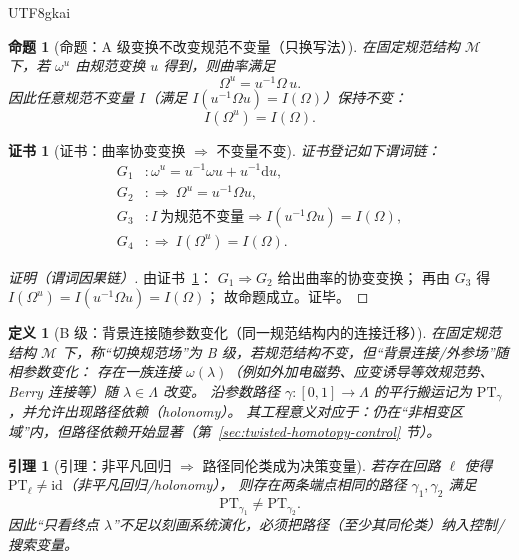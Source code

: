 \documentclass[12pt]{article}
\newtheorem{definition}{定义}[section]
\newtheorem{proposition}{命题}[section]
\newtheorem{lemma}{引理}[section]
\newtheorem{Certificate}{证书}[section]
\newcommand{\Conn}{\ensuremath{\omega}}
\newcommand{\Curv}{\ensuremath{\Omega}}
\begin{document}
\begin{CJK*}{UTF8}{gkai}
\begin{proposition}[命题：A 级变换不改变规范不变量（只换写法）]
\label{prop:gauge-fixing-does-not-change-invariants}
在固定规范结构 $\mathcal{M}$ 下，若 $\Conn^{u}$ 由规范变换 $u$ 得到，则曲率满足
\[
  \Curv^{u}=u^{-1}\Curv\,u.
\]
因此任意规范不变量 $I$（满足 $I(u^{-1}\Curv u)=I(\Curv)$）保持不变：
\[
  I(\Curv^{u})=I(\Curv).
\]
\end{proposition}

\begin{Certificate}[证书：曲率协变变换 $\Rightarrow$ 不变量不变]
\label{cert:gauge-fixing-does-not-change-invariants}
证书登记如下谓词链：
\[
\begin{aligned}
  G_1 &: \Conn^{u}=u^{-1}\Conn u + u^{-1}\mathrm{d}u,\\
  G_2 &: \Rightarrow\ \Curv^{u}=u^{-1}\Curv u,\\
  G_3 &: I\ \text{为规范不变量}\Rightarrow I(u^{-1}\Curv u)=I(\Curv),\\
  G_4 &: \Rightarrow\ I(\Curv^{u})=I(\Curv).
\end{aligned}
\]
\end{Certificate}

\begin{proof}[证明（谓词因果链）]
由证书~\ref{cert:gauge-fixing-does-not-change-invariants}：
$G_1\Rightarrow G_2$ 给出曲率的协变变换；
再由 $G_3$ 得 $I(\Curv^{u})=I(u^{-1}\Curv u)=I(\Curv)$；
故命题成立。证毕。
\end{proof}

\begin{definition}[B 级：背景连接随参数变化（同一规范结构内的连接迁移）]
在固定规范结构 $\mathcal{M}$ 下，称“切换规范场”为 B 级，若规范结构不变，但“背景连接/外参场”随相参数变化：
存在一族连接 $\Conn(\lambda)$（例如外加电磁势、应变诱导等效规范势、Berry 连接等）随 $\lambda\in\Lambda$ 改变。
沿参数路径 $\gamma:[0,1]\to\Lambda$ 的平行搬运记为 $\mathrm{PT}_{\gamma}$，并允许出现路径依赖（holonomy）。
其工程意义对应于：仍在“非相变区域”内，但路径依赖开始显著（第~\ref{sec:twisted-homotopy-control} 节）。
\end{definition}

\begin{lemma}[引理：非平凡回归 $\Rightarrow$ 路径同伦类成为决策变量]
\label{lem:holonomy-implies-path-class-relevant}
若存在回路 $\ell$ 使得 $\mathrm{PT}_{\ell}\neq \mathrm{id}$（非平凡回归/holonomy），
则存在两条端点相同的路径 $\gamma_1,\gamma_2$ 满足
\[
  \mathrm{PT}_{\gamma_1}\neq \mathrm{PT}_{\gamma_2}.
\]
因此“只看终点 $\lambda$”不足以刻画系统演化，必须把路径（至少其同伦类）纳入控制/搜索变量。
\end{lemma}


\end{CJK*}
\end{document}
